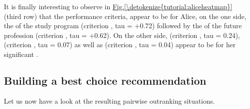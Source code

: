 \documentclass[a4paper,12pt,english]{sphinxhowto}
\begin{document}
It is finally interesting to observe in \hyperref[\detokenize{tutorial:aliceheatmap}]{Fig.\@ \ref{\detokenize{tutorial:aliceheatmap}}} (third row) that the  performance criteria, appear to be for Alice, on the one side, the  of the study program (criterion , tau = +0.72) followed by the  of the future profession (criterion , tau = +0.62). On the other side,  (criterion , tau = \sphinxhyphen{}0.24),  (criterion , tau = \sphinxhyphen{}0.07) as well as  (criterion , tau = \sphinxhyphen{}0.04) appear to be for her   significant \sphinxfootnotemark[27].


\subsection{Building a best choice recommendation}
\label{\detokenize{tutorial:building-a-best-choice-recommendation}}
Let us now have a look at the resulting pairwise outranking situations.
\def\sphinxLiteralBlockLabel{\label{\detokenize{tutorial:aliceoutranking}}}
\begin{sphinxVerbatim}[commandchars=\\\{\},numbers=left,firstnumber=1,stepnumber=1]
   
  
\end{sphinxVerbatim}
\end{document}
